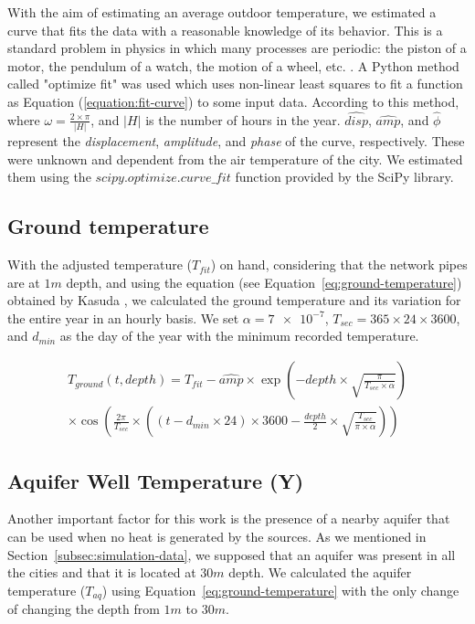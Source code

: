 \documentclass{article}
\begin{document}
With the aim of estimating an average outdoor temperature, we estimated a curve that fits the data with a reasonable knowledge of its behavior. This is a standard problem in physics in which many processes are periodic: the piston of a motor, the pendulum of a watch, the motion of a wheel, etc. \cite{fitting_curve}. A Python method called "optimize fit" was used which uses non-linear least squares to fit a function as Equation (\ref{equation:fit-curve}) to some input data. 
According to this method, where $\omega = \frac{2 \times \pi}{|H|}$, and $|H|$ is the number of hours in the year. $\widehat{disp}$, $\widehat{amp}$, and $\widehat{\phi}$ represent the \emph{displacement}, \emph{amplitude}, and \emph{phase} of the curve, respectively. These were unknown and dependent from the air temperature of the city. We estimated them using the $scipy.optimize.curve\_fit$ function provided by the SciPy\cite{2020SciPy-NMeth} library.


\subsection{Ground temperature}
With the adjusted temperature ($T_{fit}$) on hand, considering that the network pipes are at $1m$ depth, and using the equation (see Equation~\ref{eq:ground-temperature}) obtained by Kasuda \cite{measurements_of_ground_temperature_at_various_depth}, we calculated the ground temperature and its variation for the entire year in an hourly basis. We set $\alpha = \num{7e-7}$, $T_{sec} = 365 \times 24 \times 3600$, and $d_{min}$ as the day of the year with the minimum recorded temperature.

\begin{multline}
\label{eq:ground-temperature}
    T_{ground}(t, depth) = T_{fit} - \widehat{amp} \times \exp\left( 
        -depth \times \sqrt{ \frac{\pi}{T_{sec} \times \alpha}} \right) \\
    \times \cos\left( 
        \frac{2\pi}{T_{sec}} \times \left( 
            \left(t - d_{min} \times 24\right) \times 3600 -\frac{depth}{2} \times \sqrt{ \frac{T_{sec}}{\pi \times \alpha}}\right)
        \right)
\end{multline}

\subsection{Aquifer Well Temperature (Y)}
\label{subsec:aquifer}

Another important factor for this work is the presence of a nearby aquifer that can be used when no heat is generated by the sources. As we mentioned in Section~\ref{subsec:simulation-data}, we supposed that an aquifer was present in all the cities and that it is located at $30m$ depth. We calculated the aquifer temperature ($T_{aq}$) using Equation~\ref{eq:ground-temperature} with the only change of changing the depth from $1m$ to $30m$.
\end{document}

